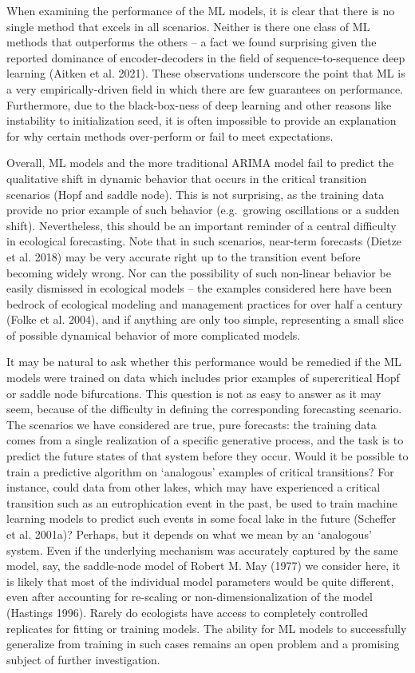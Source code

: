 \documentclass{article}
\begin{document}
When examining the performance of the ML models, it is clear that there
is no single method that excels in all scenarios. Neither is there one
class of ML methods that outperforms the others -- a fact we found
surprising given the reported dominance of encoder-decoders in the field
of sequence-to-sequence deep learning (Aitken et al. 2021). These
observations underscore the point that ML is a very empirically-driven
field in which there are few guarantees on performance. Furthermore, due
to the black-box-ness of deep learning and other reasons like
instability to initialization seed, it is often impossible to provide an
explanation for why certain methods over-perform or fail to meet
expectations.

Overall, ML models and the more traditional ARIMA model fail to predict
the qualitative shift in dynamic behavior that occurs in the critical
transition scenarios (Hopf and saddle node). This is not surprising, as
the training data provide no prior example of such behavior
(e.g.~growing oscillations or a sudden shift). Nevertheless, this should
be an important reminder of a central difficulty in ecological
forecasting. Note that in such scenarios, near-term forecasts (Dietze et
al. 2018) may be very accurate right up to the transition event before
becoming widely wrong. Nor can the possibility of such non-linear
behavior be easily dismissed in ecological models -- the examples
considered here have been bedrock of ecological modeling and management
practices for over half a century (Folke et al. 2004), and if anything
are only too simple, representing a small slice of possible dynamical
behavior of more complicated models.

It may be natural to ask whether this performance would be remedied if
the ML models were trained on data which includes prior examples of
supercritical Hopf or saddle node bifurcations. This question is not as
easy to answer as it may seem, because of the difficulty in defining the
corresponding forecasting scenario. The scenarios we have considered are
true, pure forecasts: the training data comes from a single realization
of a specific generative process, and the task is to predict the future
states of that system before they occur. Would it be possible to train a
predictive algorithm on `analogous' examples of critical transitions?
For instance, could data from other lakes, which may have experienced a
critical transition such as an eutrophication event in the past, be used
to train machine learning models to predict such events in some focal
lake in the future (Scheffer et al. 2001a)? Perhaps, but it depends on
what we mean by an `analogous' system. Even if the underlying mechanism
was accurately captured by the same model, say, the saddle-node model of
Robert M. May (1977) we consider here, it is likely that most of the
individual model parameters would be quite different, even after
accounting for re-scaling or non-dimensionalization of the model
(Hastings 1996). Rarely do ecologists have access to completely
controlled replicates for fitting or training models. The ability for ML
models to successfully generalize from training in such cases remains an
open problem and a promising subject of further investigation.
\end{document}
